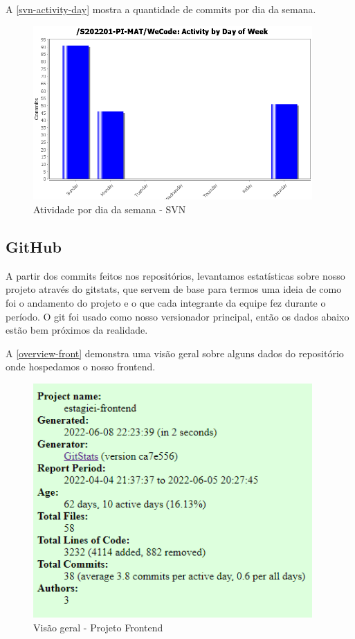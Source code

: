 A \autoref{svn-activity-day} mostra a quantidade de commits por dia da semana.
\begin{figure}[H]
	\centering
	\caption{\label{svn-activity-day}Atividade por dia da semana - SVN}
	\includegraphics[width=0.95\textwidth]{../imagens/stats/svn-activity-day.png}
\end{figure}

\subsection{GitHub}
A partir dos commits feitos nos repositórios, levantamos estatísticas sobre nosso projeto através do \gls{gitstats}, que servem de base para termos uma ideia de como foi o andamento do projeto e o que cada integrante da equipe fez durante o período.
O \gls{git} foi usado como nosso versionador principal, então os dados abaixo estão bem próximos da realidade.

A \autoref{overview-front} demonstra uma visão geral sobre alguns dados do repositório onde hospedamos o nosso frontend.
\begin{figure}[H]
	\centering
	\caption{\label{overview-front}Visão geral - Projeto Frontend}
	\includegraphics[width=0.95\textwidth]{../imagens/stats/overview-frontend.png}
\end{figure}

